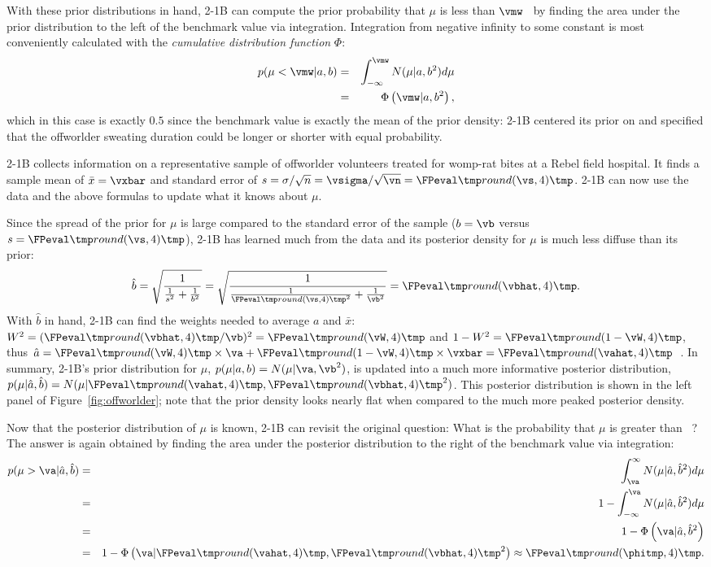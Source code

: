 With these prior distributions in hand, 2-1B can compute the prior probability that $\mu$ is less than $\vmw$~\units{} by finding the area under the prior distribution to the left of the benchmark value via integration. Integration from negative infinity to some constant is most conveniently calculated with the \emph{cumulative distribution function} $\Phi$:
\begin{eqnarray*}
  p(\mu < \vmw|a,b) &=& \int_{-\infty}^{\vmw}N(\mu|a,b^2)d\mu\\
                    &=& \Phi\left(\vmw | a, b^2\right),
\end{eqnarray*}
which in this case is exactly $0.5$ since the benchmark value is exactly the mean of the prior density: 2-1B centered its prior on \vmw{ }and specified that the offworlder sweating duration could be longer or shorter with equal probability.

2-1B collects information on a representative sample of \vn{ }offworlder volunteers treated for womp-rat bites at a Rebel field hospital. It finds a sample mean of $\bar x = \vxbar$ and standard error of $s = \sigma/\sqrt{n} = \vsigma/\sqrt{\vn} = \print{\vs}$. 2-1B can now use the data and the above formulas to update what it knows about $\mu$.

Since the spread of the prior for $\mu$ is large compared to the standard error of the sample ($b = \vb$ versus $s = \print{\vs}$), 2-1B has learned much from the data and its posterior density for $\mu$ is much less diffuse than its prior: $$\hat{b} = \sqrt{\frac{1}{\frac{1}{s^2}+\frac{1}{b^2}}} = \sqrt{\frac{1}{\frac{1}{\print{\vs}^2}+\frac{1}{\vb^2}}} = \print{\vbhat}.$$ With $\hat{b}$ in hand, 2-1B can find the weights needed to average $a$ and $\bar x$: $\W = (\print{\vbhat}/\vb)^2 = \print{\vW}$ and $1-\W = \print{1-\vW}$, thus $\hat{a} = \print{\vW} \times \va + \print{1-\vW} \times \vxbar = \print{\vahat}$~\units.  In summary, 2-1B's prior distribution for $\mu$, $p(\mu|a,b) = N(\mu|\va,\vb^2)$, is updated into a much more informative posterior distribution, $p(\mu|\hat{a},\hat{b}) = N(\mu | \print{\vahat}, \print{\vbhat}^2)$. This posterior distribution is shown in the left panel of Figure~\ref{fig:offworlder}; note that the prior density looks nearly flat when compared to the much more peaked posterior density.

Now that the posterior distribution of $\mu$ is known, 2-1B can revisit the original question: What is the probability that $\mu$ is greater than \va~\units? The answer is again obtained by finding the area under the posterior distribution to the right of the benchmark value via integration:
\begin{eqnarray*}
  p(\mu > \va | \hat{a}, \hat{b})
	&=& \int_{\va}^{\infty}N(\mu | \hat{a},\hat{b}^2)d\mu \\
	&=& 1 - \int_{-\infty}^{\va}N(\mu | \hat{a},\hat{b}^2)d\mu \\
    &=& 1 - \Phi\left(\va | \hat{a},\hat{b}^2\right) \\
    &=& 1 - \Phi\left(\va | \print{\vahat},\print{\vbhat}^2\right) \approx \print[4]{\phitmp}.
\end{eqnarray*}

